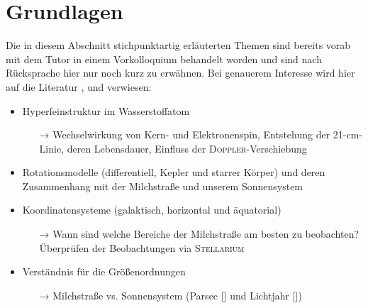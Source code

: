\section{Grundlagen}
Die in diesem Abschnitt stichpunktartig erläuterten Themen sind bereits vorab mit dem Tutor in einem Vorkolloquium behandelt worden und sind nach Rücksprache hier nur noch kurz zu erwähnen. Bei genauerem Interesse wird hier auf die Literatur \cite{H1}, \cite{Usermanual} und \cite{AntennaResp} verwiesen:
\begin{itemize}
    \item Hyperfeinstruktur im Wasserstoffatom
    \begin{itemize}
        \item[→] Wechselwirkung von Kern- und Elektronenspin, Entstehung der 21-\si{\centi \metre}-Linie, deren Lebensdauer, Einfluss der \textsc{Doppler}-Verschiebung
    \end{itemize}
    \item Rotationsmodelle (differentiell, Kepler und starrer Körper) und deren Zusammenhang mit der Milchstraße und unserem Sonnensystem
    \item Koordinatensysteme (galaktisch, horizontal und äquatorial)
    \begin{itemize}
        \item[→] Wann sind welche Bereiche der Milchstraße am besten zu beobachten? Überprüfen der Beobachtungen via \textsc{Stellarium} 
    \end{itemize}
    \item Verständnis für die Größenordnungen
    \begin{itemize}
        \item[→] Milchstraße vs. Sonnensystem (Parsec [\si{\parsec}] und Lichtjahr [\si{\lightyear}])
    \end{itemize}
\end{itemize}